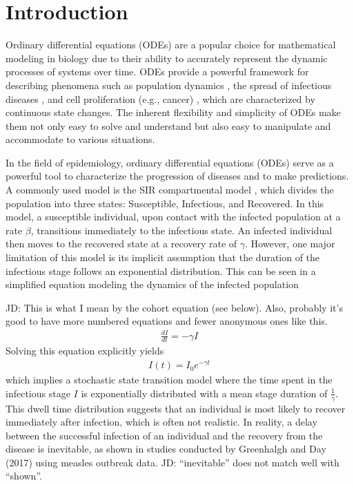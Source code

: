 \documentclass[12pt]{article}
\begin{document}
\section{Introduction}
Ordinary differential equations (ODEs) are a popular choice for mathematical modeling in biology due to their ability to accurately represent the dynamic processes of systems over time. ODEs provide a powerful framework for describing phenomena such as population dynamics \cite{salisbury2011mathematical}\cite{sego2021generation}, the spread of infectious diseases \cite{Anderson1991}\cite{Diekmann2000}\cite{Feng2016}, and cell proliferation (e.g., cancer) \cite{baker1998modelling}\cite{jarrett2018mathematical}, which are characterized by continuous state changes. The inherent flexibility and simplicity of ODEs make them not only easy to solve and understand but also easy to manipulate and accommodate to various situations.

In the field of epidemiology, ordinary differential equations (ODEs) serve as a powerful tool to characterize the progression of diseases and to make predictions. A commonly used model is the SIR compartmental model \cite{Anderson1991}\cite{kermack1927contribution}, which divides the population into three states: Susceptible, Infectious, and Recovered. In this model, a susceptible individual, upon contact with the infected population at a rate $\beta$, transitions immediately to the infectious state. An infected individual then moves to the recovered state at a recovery rate of $\gamma$. However, one major limitation of this model is its implicit assumption that the duration of the infectious stage follows an exponential distribution. This can be seen in a simplified equation modeling the dynamics of the infected population

JD: This is what I mean by the cohort equation (see below). Also, probably it's good to have more numbered equations and fewer anonymous ones like this.
\begin{align*}
    \frac{dI}{dt} = -\gamma I
\end{align*}
Solving this equation explicitly yields
\begin{align*}
    I(t) = I_0 e^{-\gamma t}
\end{align*}
which implies a stochastic state transition model where the time spent in the infectious stage $I$ is exponentially distributed with a mean stage duration of $\frac{1}{\gamma}$. This dwell time distribution suggests that an individual is most likely to recover immediately after infection, which is often not realistic. In reality, a delay between the successful infection of an individual and the recovery from the disease is inevitable, as shown in studies conducted by Greenhalgh and Day (2017) \cite{greenhalgh2017time} using measles outbreak data. JD: “inevitable” does not match well with “shown”.
\end{document}
